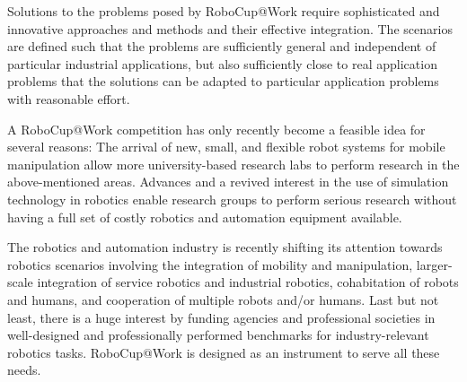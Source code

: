 Solutions to the problems posed by RoboCup@Work require sophisticated and innovative approaches and methods and their effective integration. The scenarios are defined such that the problems are sufficiently general and independent of particular industrial applications, but also sufficiently close to real application problems that the solutions can be adapted to particular application problems with reasonable effort.  
\par

A RoboCup@Work competition has only recently become a feasible idea for several reasons: The arrival of new, small, and flexible robot systems for mobile manipulation allow more university-based research labs to perform research in the above-mentioned areas. Advances and a revived interest in the use of simulation technology in robotics enable research groups to perform serious research without having a full set of costly robotics and automation equipment available. 
\par

The robotics and automation industry is recently shifting its attention towards robotics scenarios involving the integration of mobility and manipulation, larger-scale integration of service robotics and industrial robotics, cohabitation of robots and humans, and cooperation of multiple robots and/or humans. Last but not least, there is a huge interest by funding agencies and professional societies in well-designed and professionally performed benchmarks for industry-relevant robotics tasks. RoboCup@Work is designed as an instrument to serve all these needs. 
